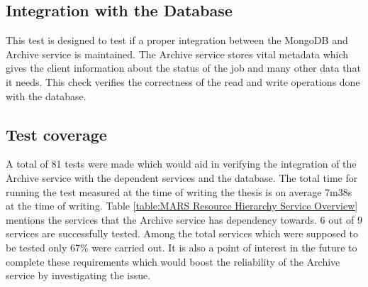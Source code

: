 \subsection{Integration with the Database}
This test is designed to test if a proper integration between the MongoDB and Archive service is maintained. The Archive service stores vital metadata
which gives the client information about the status of the job and many other data that it needs. This check verifies the correctness of the read and write 
operations done with the database. 

\subsection{Test coverage}
A total of 81 tests were made which would aid in verifying the integration of the Archive service with the dependent services and the database. The 
total time for running the test measured at the time of writing the thesis is on average 7m38s at the time of writing. Table \ref{table:MARS Resource Hierarchy Service Overview}
mentions the services that the Archive service has dependency towards. 6 out of 9 services are successfully tested. Among the total services 
which were supposed to be tested only 67\%  were carried out. It is also a point of interest in the future to complete these requirements which would boost the
reliability of the Archive service by investigating the issue.  
